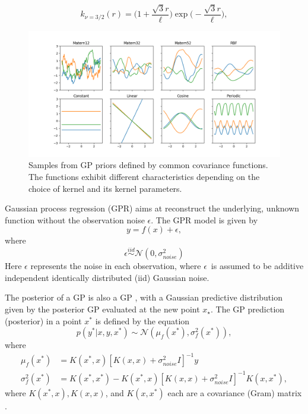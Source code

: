 \begin{equation} \label{eq:matern32}
    k_{\nu=3/2}(r) = \Big(1+\frac{\sqrt{3}r}{\ell}\Big)\exp{\Big(-\frac{\sqrt{3}r}{\ell}\Big)},
\end{equation}

\begin{figure} [t!]
    \centering
    \includegraphics[width=\textwidth]{figures/gp_kernels}
    \caption[Samples from GP priors defined by common covariance functions]
    {\small Samples from GP priors defined by common covariance functions. 
    The functions exhibit different characteristics depending on the choice of kernel and its kernel parameters.}
    \label{fig:gp-kernels}
\end{figure}

Gaussian process regression (GPR) aims at reconstruct the underlying, unknown function without the observation noise $\epsilon$.
The GPR model is given by
\begin{equation}
    y = f(x) + \epsilon,
\end{equation}
where
\[\epsilon \overset{iid}{\sim} \mathcal{N}(0, \sigma_{noise}^2)\]
Here $\epsilon$ represents the noise in each observation, where $\epsilon$ is assumed to be additive independent identically distributed (iid) Gaussian noise.

The posterior of a GP is also a GP \cite{Rasmussen2006}, with a Gaussian predictive distribution given by the posterior GP evaluated at the new point $x_\star$.
The GP prediction (posterior) in a point $x^*$ is defined by the equation
\begin{equation}
    p(y^*|x, y, x^*) \sim \mathcal{N}(\mu_f(x^*), \sigma^2_f(x^*)),
\end{equation}
where
\begin{align}
    \mu_f(x^*) &= K(x^*, x)[K(x, x) + \sigma^2_{noise}I]^{-1}y \\
    \sigma^2_f(x^*) &= K(x^*, x^*) - K(x^*, x)[K(x, x) + \sigma^2_{noise}I]^{-1}K(x,x^*),
\end{align}
where $K(x^*, x), K(x, x)$, and $K(x, x^*)$ each are a covariance (Gram) matrix \cite{Rasmussen2006}.  

